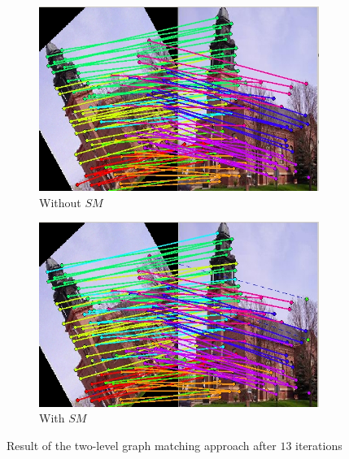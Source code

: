 \documentclass[
	fontsize=12pt,
	paper=a4,
	twoside=false,
	numbers=noenddot,
	plainheadsepline,
	toc=listof,
	toc=bibliography
]{scrartcl}
\begin{document}
\begin{figure}[ht] 
	\begin{subfigure}[b]{0.5\textwidth}
		\centering
		\includegraphics[scale=0.35]{fig/method1/test3/LL_it13.jpg} 
		\caption{Without $SM$} 
	\end{subfigure}%
	\begin{subfigure}[b]{0.5\textwidth}
		\centering
		\includegraphics[scale=0.35]{fig/method2/test3/LL_it13.jpg} 
		\caption{With $SM$} 
	\end{subfigure} 
	\caption{Result of the two-level graph matching approach after $13$ iterations }
\end{figure}
\end{document}
